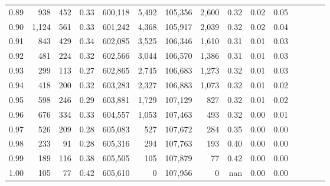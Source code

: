 \begin{tabular}{rrrcrrrrrrrrrrr}
0.89 &     938 &    452 &                                       0.33 &  600,118 &    5,492 &  105,356 &    2,600 &  0.32 &  0.02 &                         0.05 \\
0.90 &   1,124 &    561 &                                       0.33 &  601,242 &    4,368 &  105,917 &    2,039 &  0.32 &  0.02 &                         0.04 \\
0.91 &     843 &    429 &                                       0.34 &  602,085 &    3,525 &  106,346 &    1,610 &  0.31 &  0.01 &                         0.03 \\
0.92 &     481 &    224 &                                       0.32 &  602,566 &    3,044 &  106,570 &    1,386 &  0.31 &  0.01 &                         0.03 \\
0.93 &     299 &    113 &                                       0.27 &  602,865 &    2,745 &  106,683 &    1,273 &  0.32 &  0.01 &                         0.03 \\
0.94 &     418 &    200 &                                       0.32 &  603,283 &    2,327 &  106,883 &    1,073 &  0.32 &  0.01 &                         0.02 \\
0.95 &     598 &    246 &                                       0.29 &  603,881 &    1,729 &  107,129 &      827 &  0.32 &  0.01 &                         0.02 \\
0.96 &     676 &    334 &                                       0.33 &  604,557 &    1,053 &  107,463 &      493 &  0.32 &  0.00 &                         0.01 \\
0.97 &     526 &    209 &                                       0.28 &  605,083 &      527 &  107,672 &      284 &  0.35 &  0.00 &                         0.00 \\
0.98 &     233 &     91 &                                       0.28 &  605,316 &      294 &  107,763 &      193 &  0.40 &  0.00 &                         0.00 \\
0.99 &     189 &    116 &                                       0.38 &  605,505 &      105 &  107,879 &       77 &  0.42 &  0.00 &                         0.00 \\
1.00 &     105 &     77 &                                       0.42 &  605,610 &        0 &  107,956 &        0 &   nan &  0.00 &                         0.00 \\
\bottomrule
\end{tabular}
